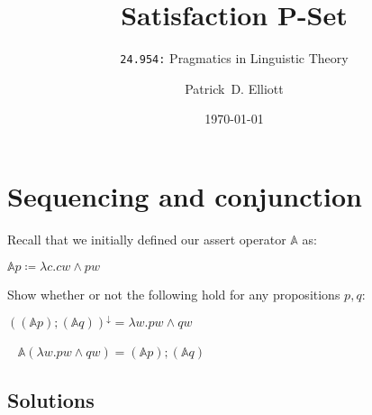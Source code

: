 \documentclass[cronos,landscape,paper=letter]{ling-handout}
\title{Satisfaction P-Set}
\subtitle{\texttt{24.954:} Pragmatics in Linguistic Theory}
\date{\today}
\author{Patrick~D. Elliott}
\begin{document}
\maketitle

\section{Sequencing and conjunction}

Recall that we initially defined our assert operator \(𝔸\) as:

\ex
\(𝔸 p ≔ λ c . c w ∧ p w\)
\xe

Show whether or not the following hold for any propositions \(p,q\):

\ex
\(((𝔸 p);(𝔸 q))^{↓} = λ w . p w ∧ q w\)
\xe

\ex~
\(𝔸 (λ w . p w ∧ q w) = (𝔸 p);(𝔸 q)\)
\xe



\printbibliography

\begin{appendix}

  \section{Solutions}

\end{appendix}
\end{document}
